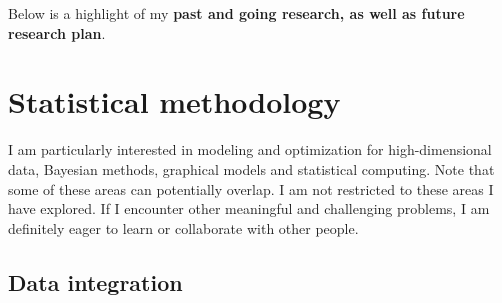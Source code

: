 \documentclass[a4paper, 10pt]{article}
\begin{document}
Below is a highlight of my \textbf{past and going research, as well as future research plan}.

\section{Statistical methodology}
I am particularly interested in modeling and optimization for high-dimensional data, Bayesian methods, graphical models and statistical computing.
Note that some of these areas can potentially overlap.
I am not restricted to these areas I have explored.
If I encounter other meaningful and challenging problems,
I am definitely eager to learn or collaborate with other people.

\subsection{Data integration}
\end{document}
